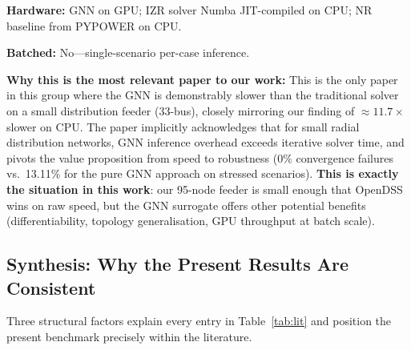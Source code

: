 \documentclass[11pt]{article}
\begin{document}
\textbf{Hardware:} GNN on GPU; IZR solver Numba JIT-compiled on CPU;
NR baseline from PYPOWER on CPU.

\textbf{Batched:} No---single-scenario per-case inference.

\textbf{Why this is the most relevant paper to our work:}
This is the only paper in this group where the GNN is demonstrably slower
than the traditional solver on a small distribution feeder (33-bus), closely
mirroring our finding of ${\approx}11.7\times$ slower on CPU.  The paper implicitly
acknowledges that for small radial distribution networks, GNN inference
overhead exceeds iterative solver time, and pivots the value proposition
from speed to robustness (0\% convergence failures vs.\ 13.11\% for the
pure GNN approach on stressed scenarios).  \textbf{This is exactly the
situation in this work}: our 95-node feeder is small enough that OpenDSS
wins on raw speed, but the GNN surrogate offers other potential benefits
(differentiability, topology generalisation, GPU throughput at batch scale).

\subsection{Synthesis: Why the Present Results Are Consistent}

Three structural factors explain every entry in Table~\ref{tab:lit} and
position the present benchmark precisely within the literature.
\end{document}
